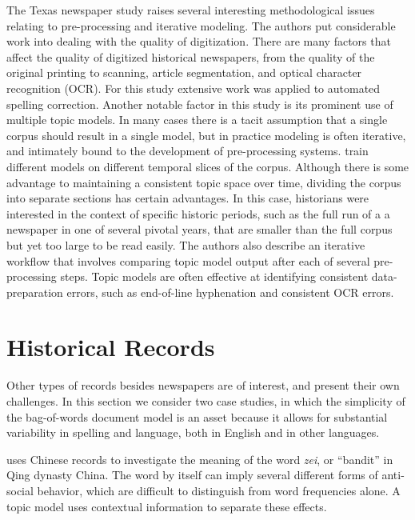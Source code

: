 The Texas newspaper study raises several interesting methodological issues relating to pre-processing and iterative modeling.
The authors put considerable work into dealing with the quality of digitization.
There are many factors that affect the quality of digitized historical newspapers, from the quality of the original printing to scanning, article segmentation, and optical character recognition (OCR).
For this study extensive work was applied to automated spelling correction.
Another notable factor in this study is its prominent use of multiple topic models.
In many cases there is a tacit assumption that a single corpus should result in a single model, but in practice modeling is often iterative, and intimately bound to the development of pre-processing systems.
\cite{yang-11-historical} train different models on different temporal slices of the corpus.
Although there is some advantage to maintaining a consistent topic space over time, dividing the corpus into separate sections has certain advantages.
In this case, historians were interested in the context of specific historic periods, such as the full run of a a newspaper in one of several pivotal years, that are smaller than the full corpus but yet too large to be read easily.
The authors also describe an iterative workflow that involves comparing topic model output after each of several pre-processing steps.
Topic models are often effective at identifying consistent data-preparation errors, such as end-of-line hyphenation and consistent OCR errors.

\section{Historical Records}

Other types of records besides newspapers are of interest, and present their own challenges.
In this section we consider two case studies, in which the simplicity of the bag-of-words document model is an asset because it allows for substantial variability in spelling and language, both in English and in other languages.

\cite{miller-13} uses Chinese records to investigate the meaning of the word {\em zei}, or ``bandit'' in Qing dynasty China. The word by itself can imply several different forms of anti-social behavior, which are difficult to distinguish from word frequencies alone. A topic model uses contextual information to separate these effects.

